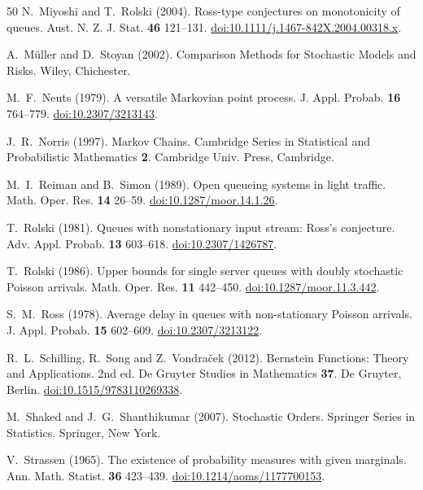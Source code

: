 \documentclass[11pt,reqno]{amsart}
\numberwithin{equation}{section}
\theoremstyle{plain}
\theoremstyle{definition}
\newcommand{\1}{\mathbf 1}
\begin{document}
\begin{thebibliography}{50}
N.~Miyoshi and T.~Rolski (2004).
Ross-type conjectures on monotonicity of queues.
Aust. N. Z. J. Stat. \textbf{46} 121--131.
\href{https://doi.org/10.1111/j.1467-842X.2004.00318.x}{doi:10.1111/j.1467-842X.2004.00318.x}.

A.~M\"uller and D.~Stoyan (2002).
Comparison Methods for Stochastic Models and Risks.
Wiley, Chichester.

M.~F.~Neuts (1979).
A versatile Markovian point process.
J. Appl. Probab. \textbf{16} 764--779.
\href{https://doi.org/10.2307/3213143}{doi:10.2307/3213143}.

J.~R.~Norris (1997).
Markov Chains.
Cambridge Series in Statistical and Probabilistic Mathematics \textbf{2}. Cambridge Univ. Press, Cambridge.

M.~I.~Reiman and B.~Simon (1989).
Open queueing systems in light traffic.
Math. Oper. Res. \textbf{14} 26--59.
\href{https://doi.org/10.1287/moor.14.1.26}{doi:10.1287/moor.14.1.26}.

T.~Rolski (1981).
Queues with nonstationary input stream: Ross's conjecture.
Adv. Appl. Probab. \textbf{13} 603--618.
\href{https://doi.org/10.2307/1426787}{doi:10.2307/1426787}.

T.~Rolski (1986).
Upper bounds for single server queues with doubly stochastic Poisson arrivals.
Math. Oper. Res. \textbf{11} 442--450.
\href{https://doi.org/10.1287/moor.11.3.442}{doi:10.1287/moor.11.3.442}.

S.~M.~Ross (1978).
Average delay in queues with non-stationary Poisson arrivals.
J. Appl. Probab. \textbf{15} 602--609.
\href{https://doi.org/10.2307/3213122}{doi:10.2307/3213122}.

R.~L.~Schilling, R.~Song and Z.~Vondra\v{c}ek (2012).
Bernstein Functions: Theory and Applications.
2nd ed. De Gruyter Studies in Mathematics \textbf{37}. De Gruyter, Berlin.
\href{https://doi.org/10.1515/9783110269338}{doi:10.1515/9783110269338}.

M.~Shaked and J.~G.~Shanthikumar (2007).
Stochastic Orders.
Springer Series in Statistics. Springer, New York.

V.~Strassen (1965).
The existence of probability measures with given marginals.
Ann. Math. Statist. \textbf{36} 423--439.
\href{https://doi.org/10.1214/aoms/1177700153}{doi:10.1214/aoms/1177700153}.


\end{thebibliography}
\end{document}
